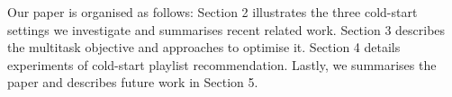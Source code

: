 Our paper is organised as follows:
Section 2 illustrates the three cold-start settings we investigate and summarises recent related work.
Section 3 describes the multitask objective and approaches to optimise it.
Section 4 details experiments of cold-start playlist recommendation. %
Lastly, we summarises the paper and describes future work in Section 5.
